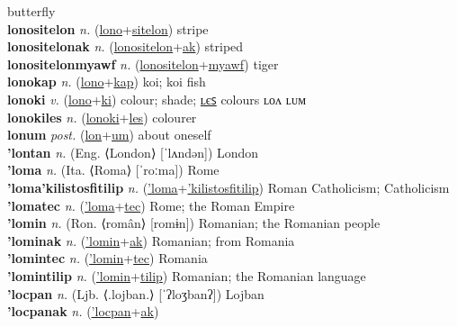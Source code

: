 butterfly \label{lonomilukutahutyeh} \\
\textbf{lonositelon} \textit{n.} (\hyperref[lono]{lono}+\hyperref[sitelon]{sitelon})
stripe \label{lonositelon} \\
\textbf{lonositelonak} \textit{n.} (\hyperref[lonositelon]{lonositelon}+\hyperref[ak]{ak})
striped \label{lonositelonak} \\
\textbf{lonositelonmyawf} \textit{n.} (\hyperref[lonositelon]{lonositelon}+\hyperref[myawf]{myawf})
tiger \label{lonositelonmyawf} \\
\textbf{lonokap} \textit{n.} (\hyperref[lono]{lono}+\hyperref[kap]{kap})
koi; koi fish \label{lonokap} \\
\textbf{lonoki} \textit{v.} (\hyperref[lono]{lono}+\hyperref[ki]{ki})
colour; shade; \hyperref[lonokiles]{ʟєꜱ} colours ʟᴏᴧ ʟᴜᴍ \label{lonoki} \\
\textbf{lonokiles} \textit{n.} (\hyperref[lonoki]{lonoki}+\hyperref[les]{les})
colourer \label{lonokiles} \\
\textbf{lonum} \textit{post.} (\hyperref[lon]{lon}+\hyperref[um]{um})
about oneself \label{lonum} \\
\textbf{'lontan} \textit{n.} (Eng. ⟨London⟩ [ˈlʌndən])
London \label{'lontan} \\
\textbf{'loma} \textit{n.} (Ita. ⟨Roma⟩ [ˈroːma])
Rome \label{'loma} \\
\textbf{'loma'kilistosfitilip} \textit{n.} (\hyperref['loma]{'loma}+\hyperref['kilistosfitilip]{'kilistosfitilip})
Roman Catholicism; Catholicism \label{'loma'kilistosfitilip} \\
\textbf{'lomatec} \textit{n.} (\hyperref['loma]{'loma}+\hyperref[tec]{tec})
Rome; the Roman Empire \label{'lomatec} \\
\textbf{'lomin} \textit{n.} (Ron. ⟨român⟩ [romɨn])
Romanian; the Romanian people \label{'lomin} \\
\textbf{'lominak} \textit{n.} (\hyperref['lomin]{'lomin}+\hyperref[ak]{ak})
Romanian; from Romania \label{'lominak} \\
\textbf{'lomintec} \textit{n.} (\hyperref['lomin]{'lomin}+\hyperref[tec]{tec})
Romania \label{'lomintec} \\
\textbf{'lomintilip} \textit{n.} (\hyperref['lomin]{'lomin}+\hyperref[tilip]{tilip})
Romanian; the Romanian language \label{'lomintilip} \\
\textbf{'locpan} \textit{n.} (Ljb. ⟨.lojban.⟩ [ˈʔloʒbanʔ])
Lojban \label{'locpan} \\
\textbf{'locpanak} \textit{n.} (\hyperref['locpan]{'locpan}+\hyperref[ak]{ak})
